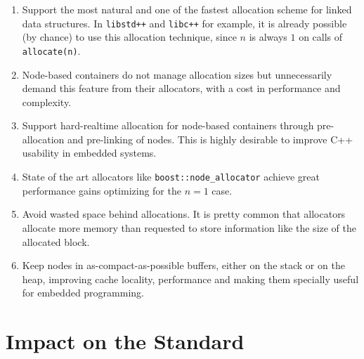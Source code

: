 \documentclass[11pt]{article}
\begin{document}
\begin{enumerate}

\item Support the most natural and one of the fastest allocation
scheme for linked data structures. In \texttt{libstd++} and
\texttt{libc++} for example, it is already possible (by chance) to use
this allocation technique, since $n$ is always $1$ on calls of
\texttt{allocate(n)}.

\item Node-based containers do not manage allocation sizes but
unnecessarily demand this feature from their allocators, with a cost
in performance and complexity.


\item Support hard-realtime allocation for node-based containers
through pre-allocation and pre-linking of nodes. This is highly
desirable to improve C++ usability in embedded systems.

\item State of the art allocators like \texttt{boost::node\_allocator}
\cite{boost} achieve great performance gains optimizing for the $n = 1$ case. 

\item Avoid wasted space behind allocations. It is pretty common that
allocators allocate more memory than requested to store information
like the size of the allocated block.

\item Keep nodes in as-compact-as-possible buffers, either on the
stack or on the heap, improving cache locality, performance and making
them specially useful for embedded programming.

\end{enumerate}



\section{Impact on the Standard} \label{impact}
\end{document}
